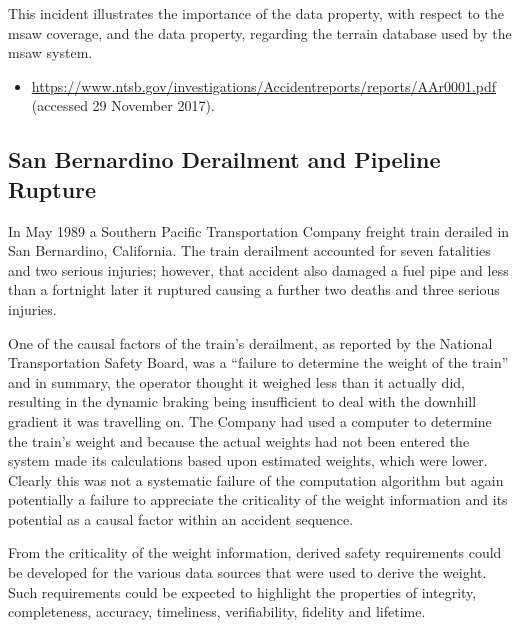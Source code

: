 This incident illustrates the importance of the \gls{data property}, with respect to the \gls{msaw} coverage, and the  \gls{data property},
regarding
the terrain \gls{database} used by the \gls{msaw} system.

\begin{samepage}
\begin{itemize}
	\item \raggedright{\href{https://www.ntsb.gov/investigations/Accidentreports/reports/AAr0001.pdf}{https://www.ntsb.gov/investigations/Accidentreports/reports/AAr0001.pdf} (accessed 29 November 2017).}
\end{itemize}
\end{samepage}

\subsection{San Bernardino Derailment and Pipeline Rupture} \label{bkm:incacc:sanbernardino}
In May 1989 a Southern Pacific Transportation Company freight train derailed in San Bernardino, California. The train derailment accounted for seven fatalities and two serious injuries; however, that accident also damaged a fuel pipe and less than a fortnight later it ruptured causing a further two deaths and three serious injuries.

One of the causal factors of the train’s derailment, as reported by the National Transportation Safety Board, was a ``failure to determine the weight of the train'' and in summary, the operator thought it weighed less than it actually did, resulting in the dynamic braking being insufficient to deal with the downhill gradient it was travelling on. The Company had used a computer to determine the train’s weight and because the actual weights had not been entered the system made its calculations based upon estimated weights, which were lower. Clearly this was not a systematic failure of the computation algorithm but again potentially a failure to appreciate the \gls{criticality} of the weight \gls{information} and its potential as a causal factor within an accident sequence.

From the \gls{criticality} of the weight \gls{information}, derived safety requirements could be developed for the various data sources that were used to derive the weight. Such requirements could be expected to highlight the properties of \gls{integrity}, \gls{completeness}, \gls{accuracy}, \gls{timeliness}, \gls{verifiability}, \gls{fidelity} and \gls{lifetime}.

